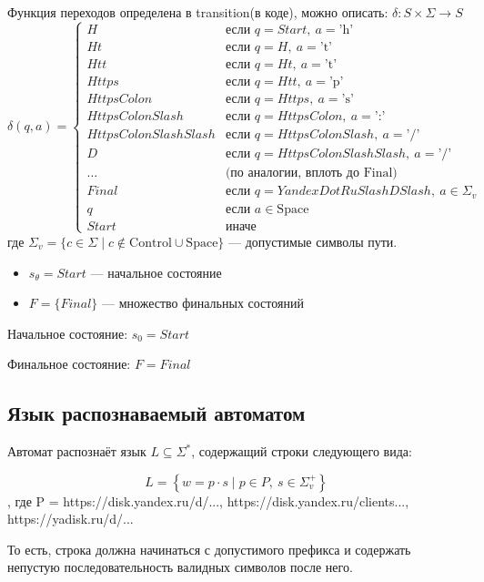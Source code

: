 \documentclass[areasetadvanced]{scrartcl}
\begin{document}
Функция переходов определена в transition(в коде), можно описать:
$\delta : S \times \Sigma \rightarrow S$ 
\[
\delta(q, a) =
\begin{cases}
	H & \text{если } q = Start, \ a = \text{'h'} \\
	Ht & \text{если } q = H, \ a = \text{'t'} \\
	Htt & \text{если } q = Ht, \ a = \text{'t'} \\
	Https & \text{если } q = Htt, \ a = \text{'p'} \\
	HttpsColon & \text{если } q = Https, \ a = \text{'s'} \\
	HttpsColonSlash & \text{если } q = HttpsColon, \ a = \text{':'} \\
	HttpsColonSlashSlash & \text{если } q = HttpsColonSlash, \ a = \text{'/'} \\
	D & \text{если } q = HttpsColonSlashSlash, \ a = \text{'/'} \\
	\ldots & \text{(по аналогии, вплоть до Final)} \\
	Final & \text{если } q = YandexDotRuSlashDSlash, \ a \in \Sigma_v \\
	q & \text{если } a \in \text{Space} \\
	Start & \text{иначе}
\end{cases}
\]
где $\Sigma_v = \{c \in \Sigma \mid c \notin \text{Control} \cup \text{Space}\}$ — допустимые символы пути.

\begin{itemize}
\item $s_\theta = Start$ — начальное состояние

\item $F = \{Final\}$ — множество финальных состояний
\end{itemize}

Начальное состояние: $s_0 = Start$

Финальное состояние: $F = {Final}$

\subsection{Язык распознаваемый автоматом}
Автомат распознаёт язык $L \subseteq \Sigma^*$, содержащий строки следующего вида:

\[
	L = \left\{ w = p \cdot s \mid p \in P,\ s \in \Sigma_v^+\right\}
\]
, где P = https://disk.yandex.ru/d/..., https://disk.yandex.ru/clients..., https://yadisk.ru/d/...

То есть, строка должна начинаться с допустимого префикса и содержать непустую последовательность валидных символов после него.
\end{document}

